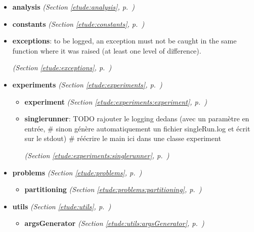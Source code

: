 \begin{itemize}
\setlength{\parskip}{0ex}
\item \textbf{analysis}
  \textit{(Section \ref{etude:analysis}, p.~\pageref{etude:analysis})}

\item \textbf{constants}
  \textit{(Section \ref{etude:constants}, p.~\pageref{etude:constants})}

\item \textbf{exceptions}: to be logged, an exception must not be caught in the same function where it
was raised (at least one level of difference).



  \textit{(Section \ref{etude:exceptions}, p.~\pageref{etude:exceptions})}

\item \textbf{experiments}
  \textit{(Section \ref{etude:experiments}, p.~\pageref{etude:experiments})}

  \begin{itemize}
\setlength{\parskip}{0ex}
    \item \textbf{experiment}
  \textit{(Section \ref{etude:experiments:experiment}, p.~\pageref{etude:experiments:experiment})}

    \item \textbf{singlerunner}: TODO rajouter le logging dedans (avec un paramètre en entrée, \# sinon 
génère automatiquement un fichier singleRun.log et écrit sur le stdout) \# 
réécrire le main ici dans une classe experiment



  \textit{(Section \ref{etude:experiments:singlerunner}, p.~\pageref{etude:experiments:singlerunner})}

  \end{itemize}
\item \textbf{problems}
  \textit{(Section \ref{etude:problems}, p.~\pageref{etude:problems})}

  \begin{itemize}
\setlength{\parskip}{0ex}
    \item \textbf{partitioning}
  \textit{(Section \ref{etude:problems:partitioning}, p.~\pageref{etude:problems:partitioning})}

  \end{itemize}
\item \textbf{utils}
  \textit{(Section \ref{etude:utils}, p.~\pageref{etude:utils})}

  \begin{itemize}
\setlength{\parskip}{0ex}
    \item \textbf{argsGenerator}
  \textit{(Section \ref{etude:utils:argsGenerator}, p.~\pageref{etude:utils:argsGenerator})}


\end{itemize}
\end{itemize}
